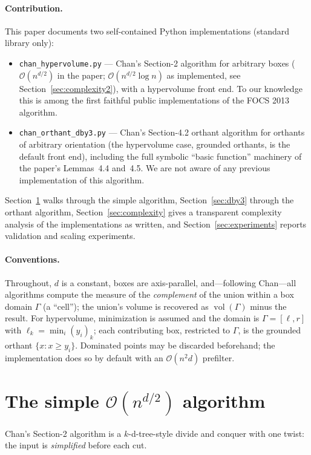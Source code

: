 \documentclass[11pt,a4paper]{article}
\theoremstyle{remark}
\newcommand{\vol}{\operatorname{vol}}
\newcommand{\Oh}{\mathcal{O}}
\begin{document}
\paragraph{Contribution.}
This paper documents two self-contained Python implementations
(standard library only):
\begin{itemize}\itemsep2pt
\item \texttt{chan\_hypervolume.py} --- Chan's Section-2 algorithm for
  arbitrary boxes ($\Oh(n^{d/2})$ in the paper; $\Oh(n^{d/2}\log n)$ as
  implemented, see Section~\ref{sec:complexity2}), with a hypervolume
  front end.  To our knowledge this is among the first faithful public
  implementations of the FOCS 2013 algorithm.
\item \texttt{chan\_orthant\_dby3.py} --- Chan's Section-4.2 orthant
  algorithm for orthants of arbitrary orientation (the hypervolume case,
  grounded orthants, is the default front end), including the full symbolic
  ``basic function'' machinery of the paper's Lemmas~4.4 and~4.5.  We are
  not aware of any previous implementation of this algorithm.
\end{itemize}
Section~\ref{sec:simple} walks through the simple algorithm,
Section~\ref{sec:dby3} through the orthant algorithm,
Section~\ref{sec:complexity} gives a transparent complexity analysis of the
implementations as written, and Section~\ref{sec:experiments} reports
validation and scaling experiments.

\paragraph{Conventions.}
Throughout, $d$ is a constant, boxes are axis-parallel, and---following
Chan---all algorithms compute the measure of the \emph{complement} of the
union within a box domain $\Gamma$ (a ``cell''); the union's volume is
recovered as $\vol(\Gamma)$ minus the result.  For hypervolume,
minimization is assumed and the domain is
$\Gamma=[\ell,r]$ with $\ell_k=\min_i (y_i)_k$; each contributing box,
restricted to $\Gamma$, is the grounded orthant $\{x : x\ge y_i\}$.
Dominated points may be discarded beforehand; the implementation does so by
default with an $\Oh(n^2 d)$ prefilter.

\section{The simple $\Oh(n^{d/2})$ algorithm}
\label{sec:simple}

Chan's Section-2 algorithm is a $k$-d-tree-style divide and conquer with one
twist: the input is \emph{simplified} before each cut.
\end{document}
